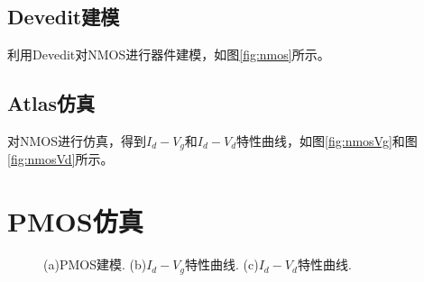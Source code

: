 \documentclass[12pt, a4paper, oneside]{ctexart}
\begin{document}
    \subsection{Devedit建模}
    利用Devedit对NMOS进行器件建模，如图\ref{fig:nmos}所示。
    
    \subsection{Atlas仿真}
    对NMOS进行仿真，得到$I_d-V_g$和$I_d-V_d$特性曲线，如图\ref{fig:nmosVg}和图\ref{fig:nmosVd}所示。

    
    \section{PMOS仿真}
    \begin{figure}[!h]
        \centering
        \hfil
        \hfil
        \caption{(a)PMOS建模. (b)$I_d-V_g$特性曲线. (c)$I_d-V_d$特性曲线.}
    \end{figure}
\end{document}
